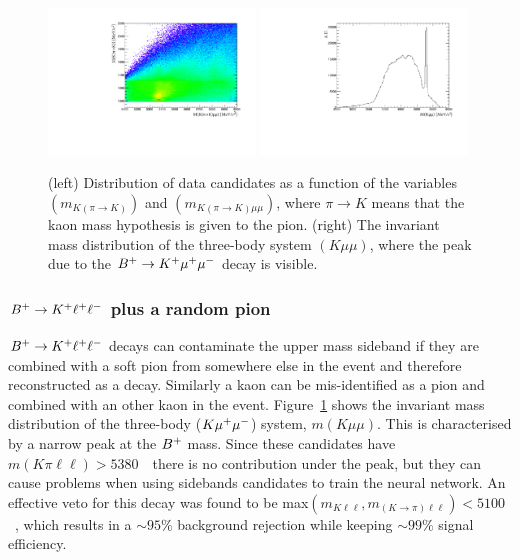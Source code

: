 \begin{center}
\begin{figure}[h!]
\centering 
\includegraphics[width=0.49\textwidth]{RKst/figs/Background/phi.pdf}
\includegraphics[width=0.49\textwidth]{RKst/figs/Background/Kmumu.pdf}
\caption{ (left) Distribution of data candidates as a function of the variables $(m_{K(\pi\rightarrow K)})$ 
and $(m_{K(\pi\rightarrow K)\mu\mu})$, where $\pi\rightarrow K$ means that the kaon mass hypothesis 
is given to the pion. (right) The invariant mass distribution of the three-body system $(K\mu\mu)$,
where the peak due to the $B^+ \rightarrow K^+ {\mu^+\mu^-}$ decay is visible. }
\label{fig:phiplots}
\end{figure}
\end{center}


\subsubsection{${{B}^+} \rightarrow K^+ \ell^+ \ell^-$ plus a random pion}

${{B}^+} \rightarrow K^+ \ell^+ \ell^-$ decays can contaminate the upper \Bz mass sideband if they are combined
with a soft pion from somewhere else in the event and therefore reconstructed as a \Bz decay.
Similarly a kaon can be mis-identified as a pion and combined with an other kaon in the event.
Figure~\ref{fig:phiplots} shows the invariant mass distribution of the three-body ($K{\mu^+\mu^-}$) system,
$m(K\mu\mu)$. This is characterised by a narrow peak at the ${{B}^+}$ mass. Since these
candidates have $m(K\pi\ell\ell) > 5380$~\mevcc~there is no contribution under the \Bz peak,
but they can cause problems when using sidebands candidates to train the neural network.
An effective veto for this decay was found to be max$(m_{K\ell\ell},m_{(K\to\pi)\ell\ell}) < 5100$~\mevcc,
which results in a $\sim95\%$ background rejection while keeping $\sim99\%$ signal efficiency.

